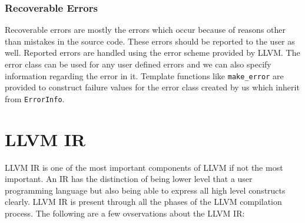 \documentclass[12pt]{article}
\newcommand{\code}{\texttt}
\begin{document}
\subsubsection{Recoverable Errors}
Recoverable errors are mostly the errors which occur because of reasons other than mistakes in the source code. These errors should be reported to the user as well. Reported errors are handled using the error scheme provided by LLVM. The error class can be used for any user defined errors and we can also specify information regarding the error in it. Template functions like \code{make\_error} are provided to construct failure values for the error class created by us which inherit from \code{ErrorInfo}.
\newpage
\section{LLVM IR}
LLVM IR is one of the most important components of LLVM if not the most important. An IR has the distinction of being lower level that a user programming language but also being able to express all high level constructs clearly. LLVM IR is present through all the phases of the LLVM compilation process. The following are a few ovservations about the LLVM IR:\\
\end{document}
